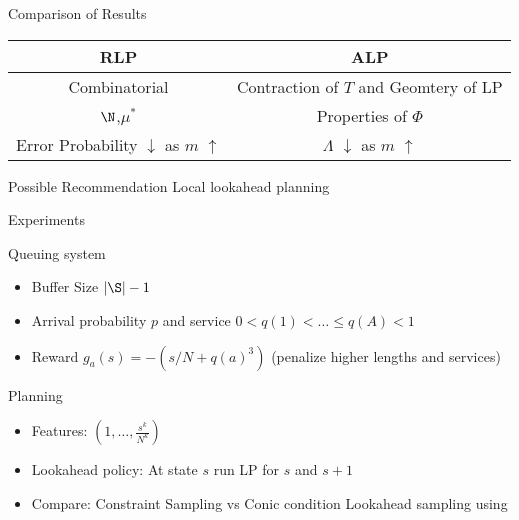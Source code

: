 \documentclass[handout,10pt]{beamer}
\begin{document}
\begin{frame}[fragile]{Comparison of Results}
\begin{table}
\begin{tabular}{|c|c|}\hline
RLP     &ALP\\ \hline
Combinatorial   & Contraction of $T$ and Geomtery of LP \\ \hline
$\N$,$\mu^*$ & Properties of $\Phi$ \\ \hline
Error Probability $\downarrow$ as $m$ $\uparrow$ & $\Lambda$ $\downarrow$ as $m$ $\uparrow$
\end{tabular}
\end{table}
\begin{block}{Possible Recommendation}
Local lookahead planning
\end{block}
\end{frame}

\begin{frame}[fragile]{Experiments}
\begin{block}{Queuing system}
\begin{itemize}
\item  Buffer Size $|\S|-1$
\item Arrival probability $p$ and service $0<q(1)<\ldots\leq q(A)<1$
\item Reward $g_a(s)=-(s/N+q(a)^3)$ (penalize higher lengths and services)
\end{itemize}
\end{block}
\begin{block}{Planning}
\begin{itemize}
\item Features: $(1,\ldots,\frac{s^k}{N^k})$
\item Lookahead policy: At state $s$ run LP for $s$ and $s+1$
\item Compare: Constraint Sampling vs Conic condition
Lookahead sampling using
\end{itemize}
\end{block}
\end{frame}
\end{document}

